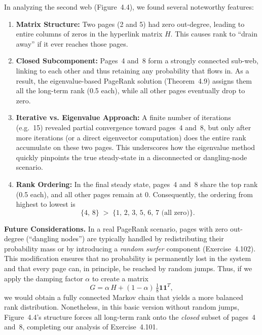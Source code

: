 \documentclass{article}
\begin{document}
In analyzing the second web (Figure~4.4), we found several noteworthy features:

\begin{enumerate}
  \item \textbf{Matrix Structure:} 
    Two pages (2 and 5) had zero out-degree, leading to entire columns of zeros in the 
    hyperlink matrix $H$. This causes rank to ``drain away'' if it ever reaches those pages.
  
  \item \textbf{Closed Subcomponent:} 
    Pages~4 and~8 form a strongly connected sub-web, linking to each other and thus 
    retaining any probability that flows in. As a result, the eigenvalue-based PageRank 
    solution (Theorem~4.9) assigns them all the long-term rank (0.5 each), while all 
    other pages eventually drop to zero.

  \item \textbf{Iterative vs. Eigenvalue Approach:} 
    A finite number of iterations (e.g.\ 15) revealed partial convergence toward pages~4 and~8, 
    but only after more iterations (or a direct eigenvector computation) does the entire rank 
    accumulate on these two pages. This underscores how the eigenvalue method quickly 
    pinpoints the true steady-state in a disconnected or dangling-node scenario.

  \item \textbf{Rank Ordering:} 
    In the final steady state, pages~4 and~8 share the top rank (0.5 each), and all other 
    pages remain at 0. Consequently, the ordering from highest to lowest is 
    \[
      \{4,\,8\} \;>\; \{1,\,2,\,3,\,5,\,6,\,7\text{ (all zero)}\}.
    \]
\end{enumerate}

\noindent
\textbf{Future Considerations.} 
In a real PageRank scenario, pages with zero out-degree (``dangling nodes'') are typically 
handled by redistributing their probability mass or by introducing a \emph{random surfer} 
component (Exercise~4.102). This modification ensures that no probability is permanently 
lost in the system and that every page can, in principle, be reached by random jumps. 
Thus, if we apply the damping factor $\alpha$ to create a matrix 
\[
G = \alpha\,H + (1-\alpha)\,\tfrac{1}{8}\mathbf{1}\mathbf{1}^T,
\]
we would obtain a fully connected Markov chain that yields a more balanced rank distribution.  
Nonetheless, in this basic version without random jumps, Figure~4.4's structure forces all 
long-term rank onto the \emph{closed} subset of pages~4 and~8, completing our analysis 
of Exercise~4.101.
\end{document}
